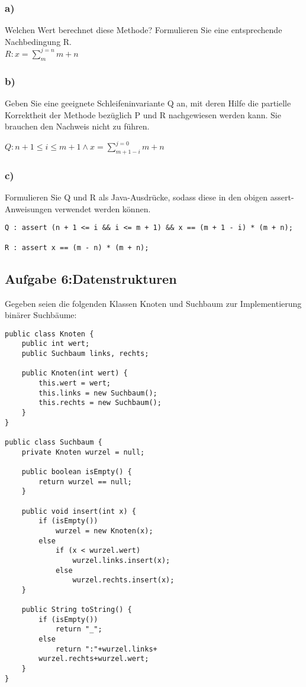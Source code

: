 \documentclass[a4paper, 10pt]{article}
\begin{document}
\subsubsection*{a)} 
Welchen Wert berechnet diese Methode? Formulieren Sie eine entsprechende Nachbedingung R.\\

$R: x = \sum_{m}^{j = n}m + n$

\subsubsection*{b)} 
Geben Sie eine geeignete Schleifeninvariante Q an, mit deren Hilfe die partielle Korrektheit der Methode bezüglich P und R nachgewiesen werden kann. Sie brauchen den Nachweis nicht zu führen.

$Q: n + 1 \leq i \leq m + 1 \wedge x = \sum_{m + 1 - i}^{j = 0}m + n$
\subsubsection*{c)} 
Formulieren Sie Q und R als Java-Ausdrücke, sodass diese in den obigen assert-Anweisungen verwendet werden können.
\begin{lstlisting}
Q : assert (n + 1 <= i && i <= m + 1) && x == (m + 1 - i) * (m + n);

R : assert x == (m - n) * (m + n);
\end{lstlisting}
\subsection*{Aufgabe 6:Datenstrukturen}
Gegeben seien die folgenden Klassen Knoten und Suchbaum
zur Implementierung binärer Suchbäume:

\begin{lstlisting}
public class Knoten {
	public int wert;
	public Suchbaum links, rechts;

	public Knoten(int wert) {
		this.wert = wert;
		this.links = new Suchbaum();
		this.rechts = new Suchbaum();
	}
}

public class Suchbaum {
	private Knoten wurzel = null;
	
	public boolean isEmpty() {
		return wurzel == null;
	}
	
	public void insert(int x) {
		if (isEmpty())
			wurzel = new Knoten(x);
		else
			if (x < wurzel.wert)
				wurzel.links.insert(x);
			else
				wurzel.rechts.insert(x);
	}

	public String toString() {
		if (isEmpty())
			return "_";
		else
			return ":"+wurzel.links+
		wurzel.rechts+wurzel.wert;
	}
}
\end{lstlisting}
\end{document}
